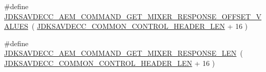 \begin{DoxyCompactItemize}
\item 
\#define \hyperlink{group__command__get__mixer__response_gae496a3e6ad398470de201e0fa2533191}{J\+D\+K\+S\+A\+V\+D\+E\+C\+C\+\_\+\+A\+E\+M\+\_\+\+C\+O\+M\+M\+A\+N\+D\+\_\+\+G\+E\+T\+\_\+\+M\+I\+X\+E\+R\+\_\+\+R\+E\+S\+P\+O\+N\+S\+E\+\_\+\+O\+F\+F\+S\+E\+T\+\_\+\+V\+A\+L\+U\+ES}~( \hyperlink{group__jdksavdecc__avtp__common__control__header_gaae84052886fb1bb42f3bc5f85b741dff}{J\+D\+K\+S\+A\+V\+D\+E\+C\+C\+\_\+\+C\+O\+M\+M\+O\+N\+\_\+\+C\+O\+N\+T\+R\+O\+L\+\_\+\+H\+E\+A\+D\+E\+R\+\_\+\+L\+EN} + 16 )
\item 
\#define \hyperlink{group__command__get__mixer__response_ga0381a2c7ed0e68b3bd478d4f2ba9f4c5}{J\+D\+K\+S\+A\+V\+D\+E\+C\+C\+\_\+\+A\+E\+M\+\_\+\+C\+O\+M\+M\+A\+N\+D\+\_\+\+G\+E\+T\+\_\+\+M\+I\+X\+E\+R\+\_\+\+R\+E\+S\+P\+O\+N\+S\+E\+\_\+\+L\+EN}~( \hyperlink{group__jdksavdecc__avtp__common__control__header_gaae84052886fb1bb42f3bc5f85b741dff}{J\+D\+K\+S\+A\+V\+D\+E\+C\+C\+\_\+\+C\+O\+M\+M\+O\+N\+\_\+\+C\+O\+N\+T\+R\+O\+L\+\_\+\+H\+E\+A\+D\+E\+R\+\_\+\+L\+EN} + 16 )
\end{DoxyCompactItemize}
